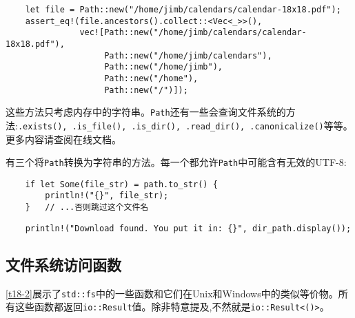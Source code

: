 \begin{verbatim}
    let file = Path::new("/home/jimb/calendars/calendar-18x18.pdf");
    assert_eq!(file.ancestors().collect::<Vec<_>>(),
               vec![Path::new("/home/jimb/calendars/calendar-18x18.pdf"),
                    Path::new("/home/jimb/calendars"),
                    Path::new("/home/jimb"),
                    Path::new("/home"),
                    Path::new("/")]);
\end{verbatim}

这些方法只考虑内存中的字符串。\texttt{Path}还有一些会查询文件系统的方法:\texttt{.exists(), .is\_file(), .is\_dir(), .read\_dir(), .canonicalize()}等等。更多内容请查阅在线文档。

有三个将\texttt{Path}转换为字符串的方法。每一个都允许\texttt{Path}中可能含有无效的UTF-8:
\begin{verbatim}
    if let Some(file_str) = path.to_str() {
        println!("{}", file_str);
    }   // ...否则跳过这个文件名
\end{verbatim}


\begin{verbatim}
    println!("Download found. You put it in: {}", dir_path.display());
\end{verbatim}

\subsection{文件系统访问函数}
\autoref{t18-2}展示了\texttt{std::fs}中的一些函数和它们在Unix和Windows中的类似等价物。所有这些函数都返回\texttt{io::Result}值。除非特意提及,不然就是\texttt{io::Result<()>}。

